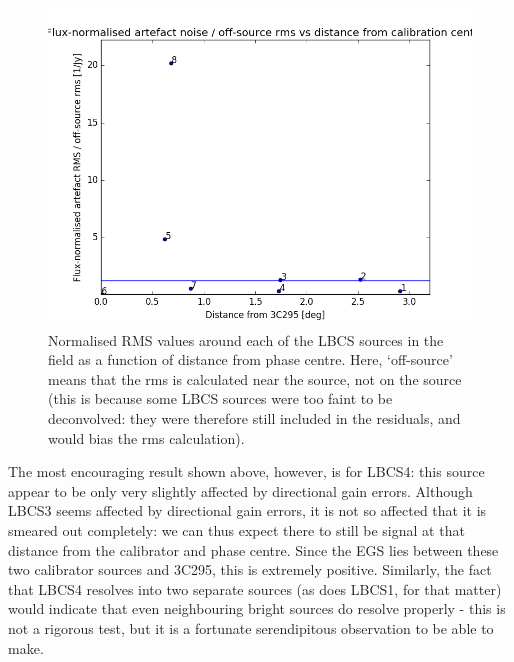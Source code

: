 \begin{figure}[h!]
\includegraphics[width=0.8\linewidth]{images/NormArtefactRMSvsDistFrom3c295.png}
\caption{Normalised RMS values around each of the LBCS sources in the field as a function of distance from phase centre. Here, `off-source' means that the rms is calculated near the source, not on the source (this is because some LBCS sources were too faint to be deconvolved: they were therefore still included in the residuals, and would bias the rms calculation).}
\label{fig.rmsratio.distEGS}
\end{figure}

\pg
The most encouraging result shown above, however, is for LBCS4: this source appear to be only very slightly affected by directional gain errors. Although LBCS3 seems affected by directional gain errors, it is not so affected that it is smeared out completely: we can thus expect there to still be signal at that distance from the calibrator and phase centre. Since the EGS lies between these two calibrator sources and 3C295, this is extremely positive. Similarly, the fact that LBCS4 resolves into two separate sources (as does LBCS1, for that matter) would indicate that even neighbouring bright sources do resolve properly - this is not a rigorous test, but it is a fortunate serendipitous observation to be able to make.


%




